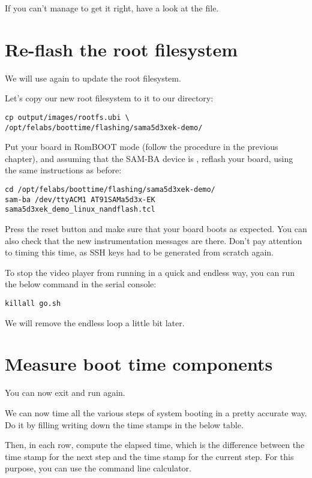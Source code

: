If you can't manage to get it right, have a look at the
 file.
 
\section{Re-flash the root filesystem}

We will use  again to update the root filesystem.

Let's copy our new root filesystem to it to our  directory:

\begin{verbatim}
cp output/images/rootfs.ubi \
/opt/felabs/boottime/flashing/sama5d3xek-demo/ 
\end{verbatim}

Put your board in RomBOOT mode (follow the procedure in the previous
chapter), and assuming that the SAM-BA device is \code{/dev/ttyACM1},
reflash your board, using the same instructions as before:

\begin{verbatim}
cd /opt/felabs/boottime/flashing/sama5d3xek-demo/ 
sam-ba /dev/ttyACM1 AT91SAMa5d3x-EK sama5d3xek_demo_linux_nandflash.tcl
\end{verbatim}

Press the reset button and make sure that your board boots as
expected. You can also check that the new instrumentation messages are
there. Don't pay attention to timing this time, as SSH keys had to be
generated from scratch again.

To stop the video player from running in a quick and endless way,
you can run the below command in the serial console:

\begin{verbatim}
killall go.sh
\end{verbatim}

We will remove the endless loop a little bit later.

\section{Measure boot time components}

You can now exit  and run  again.

We can now time all the various steps of system booting in a pretty
accurate way. Do it by filling writing down the time stamps in the below
table.

Then, in each row, compute the elapsed time, which is the difference
between the time stamp for the next step and the time stamp for the current step.
For this purpose, you can use the \code{bc -l} command line calculator.

